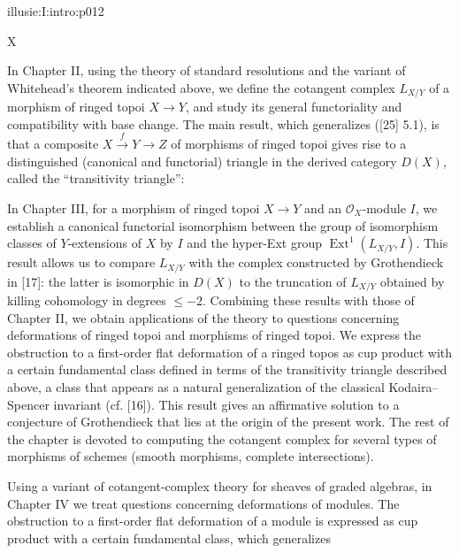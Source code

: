 \IllusieSetPhysicalPageSize{447bp}{698.6bp}
\begin{illusiefrontpage}{illusie:I:intro:p012}{}
\begin{center}\fontsize{10}{12}\selectfont X\end{center}
\vspace{12bp}
\hypertarget{illusie:I:intro:p012:p1}{}%
In Chapter II, using the theory of standard resolutions and the variant of
Whitehead's theorem indicated above, we define the cotangent complex $L_{X/Y}$ of
a morphism of ringed topoi $X\longrightarrow Y$, and study its general
functoriality and compatibility with base change. The main result, which
generalizes ([25] 5.1), is that a composite
$X\xrightarrow{f}Y\longrightarrow Z$ of morphisms of ringed topoi gives rise to a
distinguished (canonical and functorial) triangle in the derived category $D(X)$,
called the ``transitivity triangle'':

\hypertarget{illusie:I:intro:p012:d1}{}%
\IllusieTransitivityTriangle

\vspace{1bp}
\hypertarget{illusie:I:intro:p012:p2}{}%
In Chapter III, for a morphism of ringed topoi $X\longrightarrow Y$ and an
$\mathcal O_X$-module $I$, we establish a canonical functorial isomorphism between
the group of isomorphism classes of $Y$-extensions of $X$ by $I$ and the hyper-Ext
group $\operatorname{Ext}^{1}(L_{X/Y},I)$. This result allows us to compare
$L_{X/Y}$ with the complex constructed by Grothendieck in [17]: the latter is
isomorphic in $D(X)$ to the truncation of $L_{X/Y}$ obtained by killing cohomology
in degrees $\leq -2$. Combining these results with those of Chapter II, we obtain
applications of the theory to questions concerning deformations of ringed topoi
and morphisms of ringed topoi. We express the obstruction to a first-order flat
deformation of a ringed topos as cup product with a certain fundamental class
defined in terms of the transitivity triangle described above, a class that
appears as a natural generalization of the classical Kodaira--Spencer invariant
(cf. [16]). This result gives an affirmative solution to a conjecture of
Grothendieck that lies at the origin of the present work. The rest of the chapter
is devoted to computing the cotangent complex for several types of morphisms of
schemes (smooth morphisms, complete intersections).

\vspace{4bp}
\hypertarget{illusie:I:intro:p012:p3}{}%
Using a variant of cotangent-complex theory for sheaves of graded algebras, in
Chapter IV we treat questions concerning deformations of modules. The obstruction
to a first-order flat deformation of a module is expressed as cup product with a
certain fundamental class, which generalizes
\end{illusiefrontpage}
